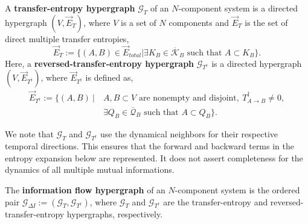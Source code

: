 \documentclass{comnet}%
\begin{document}
\begin{definition}
	A \textbf{transfer-entropy hypergraph} $\mathcal{G}_{T}$ of an $N$-component system is a directed hypergraph $(V, \overrightarrow{E}_{T})$, where $V$ is a set of $N$ components and $\overrightarrow{E}_{T}$ is the set of direct multiple transfer entropies,
\begin{equation}
	\overrightarrow{E}_{T} := \{ (A, B) \in \overrightarrow{E}_{total} | \exists K_{B} \in \overline{\mathcal{K}}_{B} \text{ such that } A \subset K_{B} \}. 
\end{equation}
Here, a \textbf{reversed-transfer-entropy hypergraph} $\mathcal{G}_{T^{\dagger}}$ is a directed hypergraph $(V, \overrightarrow{E}_{T^{\dagger}})$, where $\overrightarrow{E}_{T^{\dagger}}$ is defined as,
\begin{equation}
	 \begin{aligned}
\overrightarrow{E}_{T^{\dagger}} := \{ (A, B)\ |\ &A,B \subset V \text{ are nonempty and disjoint},\ T^{\dagger}_{A \to B} \not= 0,\\
 &\exists Q_B \in \overline{\mathcal{Q}}_B \text{ such that } A \subset Q_B \}.
\end{aligned}
\end{equation}
\end{definition}
We note that $\mathcal{G}_{T}$ and $\mathcal{G}_{T^{\dagger}}$ use the dynamical neighbors for their respective temporal directions. This ensures that the forward and backward terms in the entropy expansion below are represented. It does not assert completeness for the dynamics of all multiple mutual informations.\\

\begin{definition}
	The \textbf{information flow hypergraph} of an $N$-component system is the ordered pair $\mathcal{G}_{\Delta I} := (\mathcal{G}_{T}, \mathcal{G}_{T^{\dagger}})$, where $\mathcal{G}_{T}$ and $\mathcal{G}_{T^{\dagger}}$ are the transfer-entropy and reversed-transfer-entropy hypergraphs, respectively.\\
\end{definition}
\end{document}
